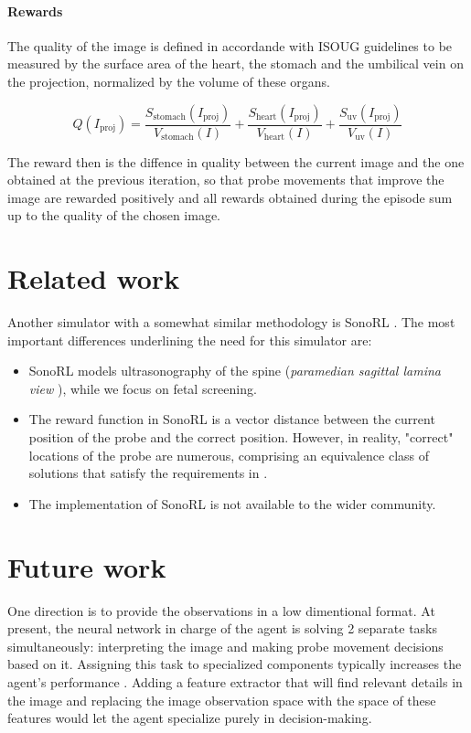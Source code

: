 \paragraph{Rewards}

The quality of the image is defined in accordande with ISOUG guidelines \cite{isoug-guidelines} to be measured by the surface area of the heart, the stomach and the umbilical vein on the projection, normalized by the volume of these organs.

\begin{equation}
    Q(I_\text{proj}) = \frac{S_\text{stomach}(I_\text{proj})}{V_\text{stomach}(I)} + \frac{S_\text{heart}(I_\text{proj})}{V_\text{heart}(I)} + \frac{S_\text{uv}(I_\text{proj})}{V_\text{uv}(I)}
\end{equation}

The reward then is the diffence in quality between the current image and the one obtained at the previous iteration, so that probe movements that improve the image are rewarded positively and all rewards obtained during the episode sum up to the quality of the chosen image.

\newpage
\section{Related work}

Another simulator with a somewhat similar methodology is SonoRL \cite{sonorl}. The most important differences underlining the need for this simulator are:
\begin{itemize}
    \item SonoRL models ultrasonography of the spine (\emph{paramedian sagittal lamina view} \cite{spinal-guidelines}), while we focus on fetal screening.
    \item The reward function in SonoRL is a vector distance between the current position of the probe and the correct position. However, in reality, "correct" locations of the probe are numerous, comprising an equivalence class of solutions that satisfy the requirements in \cite{isoug-guidelines}.
    \item The implementation of SonoRL is not available to the wider community.
\end{itemize}

\newpage
\section{Future work}

One direction is to provide the observations in a low dimentional format.
At present, the neural network in charge of the agent is solving 2 separate tasks simultaneously: interpreting the image and making probe movement decisions based on it. Assigning this task to specialized components typically increases the agent's performance \cite{decoupling-rl}. Adding a feature extractor that will find relevant details in the image and replacing the image observation space with the space of these features would let the agent specialize purely in decision-making.

